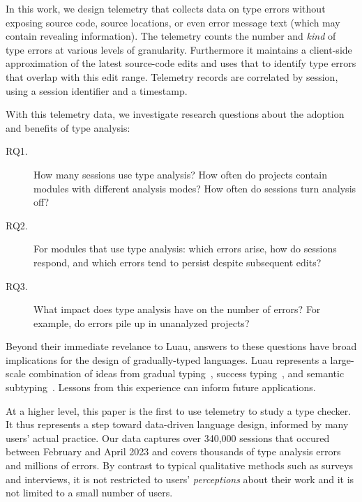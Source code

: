 \documentclass[english,submission,cleveref]{programming}
\begin{document}
In this work, we design telemetry that collects data on type errors without
exposing source code, source locations, or even error message text (which
may contain revealing information).
The telemetry counts the number and \emph{kind} of type errors at various
levels of granularity.
Furthermore it maintains a client-side approximation of the latest source-code
edits and uses that to identify type errors that overlap with this edit range.
Telemetry records are correlated by session, using a \panon{} session
identifier and a timestamp.

With this telemetry data, we investigate research questions about
the adoption and benefits of type analysis:
\begin{description}
  \item[RQ1.]
    How many sessions use type analysis?
    How often do projects contain modules with different
    analysis modes?
    How often do sessions turn analysis off?
  \item[RQ2.]
    For modules that use type analysis:
    which errors arise,
    how do sessions respond,
    and which errors tend to persist despite subsequent edits?
  \item[RQ3.]
    What impact does type analysis have on the number of \FS{}
    errors?
    For example, do \FS{} errors pile up in unanalyzed projects?
\end{description}

Beyond their immediate revelance to {Luau},
answers to these questions have broad implications for the design
of gradually-typed languages.
Luau represents a large-scale combination of ideas from
gradual typing~\cite{st-sfp-2006,tfffgksst-snapl-2017,bat-ecoop-2014},
success typing~\cite{lindahl2006practical},
and semantic subtyping~\cite{CF05:GentleIntroduction,Jef22:SemanticSubtyping}.
Lessons from this experience can inform future applications.

At a higher level, this paper is the first to use telemetry 
to study a type checker.
It thus represents a step toward data-driven language design,
informed by many users' actual practice.
Our data captures over 340,000 sessions
that occured between February and April 2023
and covers thousands of type analysis errors
and millions of \FS{} errors.
By contrast to typical qualitative methods such as surveys and interviews, it
is not restricted to users' \emph{perceptions} about their work and it is not
limited to a small number of users.
\end{document}
